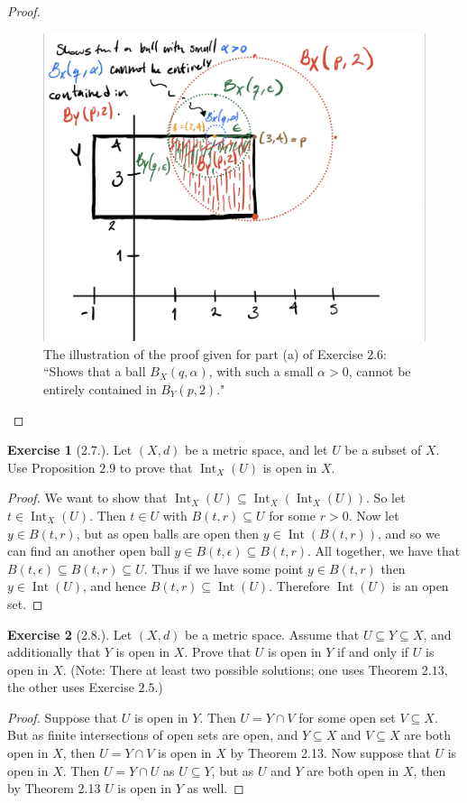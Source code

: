 \documentclass[10pt,reqno]{amsart}
\theoremstyle{definition}
\newtheorem{exercise}{Exercise}[section]
\DeclareMathOperator{\Int}{Int}
\begin{document}
\begin{proof}
	\begin{figure}[h!]
	\includegraphics[scale = .2]{IMG_0690.jpg}
	\caption{The illustration of the proof given for part (a) of Exercise 2.6: 
	``Shows that a ball $B_X(q, \alpha)$, with such a small $\alpha > 0$, cannot be entirely contained in $B_Y(p,2)$."}
		\end{figure}
\end{proof}
\begin{exercise}[2.7.]Let $(X,d)$ be a metric space, and let $U$ be a subset of $X$. Use Proposition $2.9$ to prove that $\Int _ X (U)$ is open in $X$.
\end{exercise}
\begin{proof} We want to show that $\Int_X(U) \subseteq \Int_X(\Int_X(U))$. So let $t \in \Int_X(U)$. Then $t \in U$ with $B(t,r) \subseteq U$ for some $r>0$. Now let $y \in B(t,r)$, but as open balls are open then $y \in \Int(B(t,r))$, and so we can find an another open ball $y \in B(t, \epsilon) \subseteq B(t,r)$. All together, we have that $B(t, \epsilon) \subseteq B(t,r) \subseteq U$. Thus if we have some point $y \in B(t,r)$ then $y \in \Int (U)$, and hence $B(t,r) \subseteq \Int (U)$. Therefore $\Int (U)$ is an open set. 
\end{proof}

\begin{exercise}[2.8.] Let $(X, d)$ be a metric space. Assume that $U \subseteq Y \subseteq X$, and additionally that $Y$ is open in $X$. Prove that $U$ is open in $Y$ if and only if $U$ is open in $X$. (Note: There at least two possible solutions; one uses Theorem $2.13$, the other uses Exercise $2.5.$)
\end{exercise}

\begin{proof}
	Suppose that $U$ is open in $Y$. Then $U = Y \cap V$ for some open set $V \subseteq X$. But as finite intersections of open sets are open, and $Y \subseteq X$ and $V \subseteq X$ are both open in $X$, then $U = Y \cap V$ is open in $X$ by Theorem 2.13. Now suppose that $U$ is open in $X$. Then $ U = Y \cap U$ as $U \subseteq Y$, but as $U$ and $Y$ are both open in $X$, then by Theorem 2.13 $U$ is open in $Y$ as well.  
\end{proof}
\end{document}
